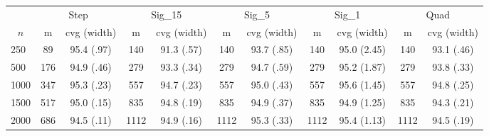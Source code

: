 \begin{tabular}{lcccccccccc}
   \toprule
 
           & \multicolumn{2}{c}{Step}& \multicolumn{2}{c}{Sig\_15}& \multicolumn{2}{c}{Sig\_5}& \multicolumn{2}{c}{Sig\_1}& \multicolumn{2}{c}{Quad} \\ 
             \cmidrule(l{2pt}r{2pt}){2-3} \cmidrule(l{2pt}r{2pt}){4-5} \cmidrule(l{2pt}r{2pt}){6-7} \cmidrule(l{2pt}r{2pt}){8-9}  \cmidrule(l{2pt}r{2pt}){10-11} 
             \multicolumn{1}{c}{$n$} & \multicolumn{1}{c}{m}& \multicolumn{1}{c}{cvg (width)}& \multicolumn{1}{c}{m}& \multicolumn{1}{c}{cvg (width)}& \multicolumn{1}{c}{m}& \multicolumn{1}{c}{cvg (width)}& \multicolumn{1}{c}{m}& \multicolumn{1}{c}{cvg (width)}& \multicolumn{1}{c}{m}& \multicolumn{1}{c}{cvg (width)} \\ \midrule 
        250 & 89 & 95.4 (.97) & 140 & 91.3 (.57) & 140 & 93.7 (.85) & 140 & 95.0 (2.45) & 140 & 93.1 (.46) \\ 
  500 & 176 & 94.9 (.46) & 279 & 93.3 (.34) & 279 & 94.7 (.59) & 279 & 95.2 (1.87) & 279 & 93.8 (.33) \\ 
  1000 & 347 & 95.3 (.23) & 557 & 94.7 (.23) & 557 & 95.0 (.43) & 557 & 95.6 (1.45) & 557 & 94.8 (.25) \\ 
  1500 & 517 & 95.0 (.15) & 835 & 94.8 (.19) & 835 & 94.9 (.37) & 835 & 94.9 (1.25) & 835 & 94.3 (.21) \\ 
  2000 & 686 & 94.5 (.11) & 1112 & 94.9 (.16) & 1112 & 95.3 (.33) & 1112 & 95.4 (1.13) & 1112 & 94.5 (.19) \\ 
   \hline
\end{tabular}
